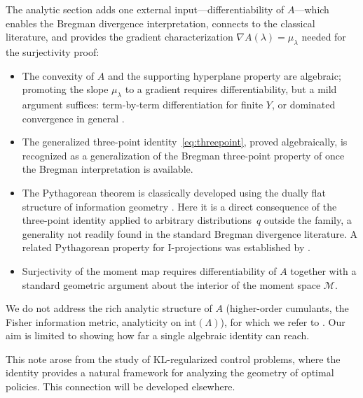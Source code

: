 \documentclass[11pt, a4paper, 
onecolumn, 
showabstract]{naverlabseurope-onecol-flex}
\theoremstyle{definition}
\theoremstyle{remark}
\newcommand{\cM}{\mathcal{M}}
\begin{document}
The analytic section adds one external input---differentiability of $A$---which enables the Bregman divergence interpretation, connects to the classical literature, and provides the gradient characterization $\nabla A(\lambda) = \mu_\lambda$ needed for the surjectivity proof:
\begin{itemize}[itemsep=3pt]
    \item The convexity of $A$ and the supporting hyperplane property are algebraic; promoting the slope $\mu_\lambda$ to a gradient requires differentiability, but a mild argument suffices: term-by-term differentiation for finite $Y$, or dominated convergence in general \cite{Brown1986,WainwrightJordan2008}.

    \item The generalized three-point identity~\eqref{eq:threepoint}, proved algebraically, is recognized as a generalization of the Bregman three-point property of \cite{Banerjee2005} once the Bregman interpretation is available.

    \item The Pythagorean theorem is classically developed using the dually flat structure of information geometry \cite{Amari1985,AmariNagaoka2000}.
    Here it is a direct consequence of the three-point identity applied to arbitrary distributions~$q$ outside the family, a generality not readily found in the standard Bregman divergence literature.
    A related Pythagorean property for I-projections was established by \cite{Csiszar1975}.

    \item Surjectivity of the moment map requires differentiability of $A$ together with a standard geometric argument about the interior of the moment space $\cM$.
\end{itemize}

\smallskip

We do not address the rich analytic structure of $A$ (higher-order cumulants, the Fisher information metric, analyticity on $\mathrm{int}(\Lambda)$), for which we refer to \cite{Brown1986,WainwrightJordan2008}.
Our aim is limited to showing how far a single algebraic identity can reach.

\smallskip

This note arose from the study of KL-regularized control problems, where the identity provides a natural framework for analyzing the geometry of optimal policies.
This connection will be developed elsewhere.



\end{document}
